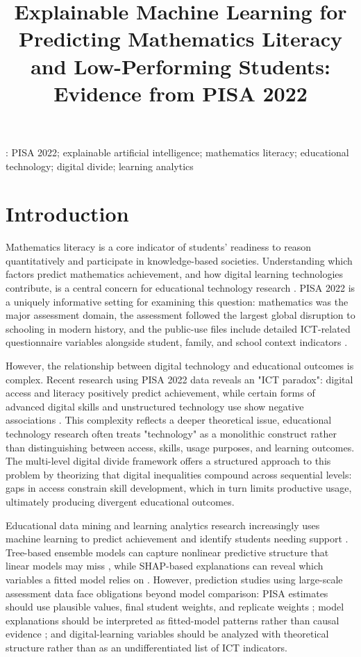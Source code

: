 \documentclass[pdflatex,sn-mathphys-ay]{sn-jnl}
\title[XAI for PISA 2022 Mathematics Literacy]{Explainable Machine Learning for Predicting Mathematics Literacy and Low-Performing Students: Evidence from PISA 2022}
\author*[1]{\fnm{Zhiren} \sur{Xiao}}\email{241734106@m.gduf.edu.cn}
\affil*[1]{\orgname{Guangdong University of Finance}, \country{China}}
\begin{document}
\maketitle

: PISA 2022; explainable artificial intelligence; mathematics literacy; educational technology; digital divide; learning analytics

\section{Introduction}

Mathematics literacy is a core indicator of students' readiness to reason quantitatively and participate in knowledge-based societies. Understanding which factors predict mathematics achievement, and how digital learning technologies contribute, is a central concern for educational technology research \citep{OECD_2022_results_vol1}. PISA 2022 is a uniquely informative setting for examining this question: mathematics was the major assessment domain, the assessment followed the largest global disruption to schooling in modern history, and the public-use files include detailed ICT-related questionnaire variables alongside student, family, and school context indicators \citep{OECD_2022_results_vol2,OECD_2022_database}.

However, the relationship between digital technology and educational outcomes is complex. Recent research using PISA 2022 data reveals an "ICT paradox": digital access and literacy positively predict achievement, while certain forms of advanced digital skills and unstructured technology use show negative associations \citep{Joshi_2025_digital_literacy,Joshi_2025_digital_resources}. This complexity reflects a deeper theoretical issue, educational technology research often treats "technology" as a monolithic construct rather than distinguishing between access, skills, usage purposes, and learning outcomes. The multi-level digital divide framework \citep{van_Dijk_2005,van_Dijk_2020} offers a structured approach to this problem by theorizing that digital inequalities compound across sequential levels: gaps in access constrain skill development, which in turn limits productive usage, ultimately producing divergent educational outcomes.

Educational data mining and learning analytics research increasingly uses machine learning to predict achievement and identify students needing support \citep{Romero_Ventura_2020,Ifenthaler_Yau_2020}. Tree-based ensemble models can capture nonlinear predictive structure that linear models may miss \citep{Breiman_2001,Fernandez_Delgado_2014}, while SHAP-based explanations can reveal which variables a fitted model relies on \citep{Lundberg_Lee_2017}. However, prediction studies using large-scale assessment data face obligations beyond model comparison: PISA estimates should use plausible values, final student weights, and replicate weights \citep{OECD_2022_technical,Rutkowski_2010}; model explanations should be interpreted as fitted-model patterns rather than causal evidence \citep{Rudin_2019,Molnar_2022}; and digital-learning variables should be analyzed with theoretical structure rather than as an undifferentiated list of ICT indicators.
\end{document}
